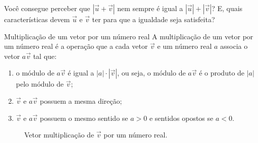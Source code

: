 \begin{reflection}

Você consegue perceber que \(|\vec{u}+\vec{v}|\) nem sempre é igual a \(|\vec{u}|+|\vec{v}|\)? E, quais características devem \(\vec{u}\) e \(\vec{v}\) ter para que a igualdade seja satisfeita?
\end{reflection}


\begin{observationtitle}{Multiplicação de um vetor por um número real}
A multiplicação de um vetor por um número real é a operação que a cada vetor \(\vec{v}\) e um número real \(a\) associa o vetor \(a\vec{v}\) tal que:
\begin{enumerate}
\item {} 
o módulo de \(a\vec{v}\) é igual a \(|a|\cdot|\vec{v}|\), ou seja, o módulo de \(a\vec{v}\) é o produto de \(|a|\)  pelo módulo de \(\vec{v}\);

\item {} 
\(\vec{v}\) e \(a\vec{v}\) possuem a mesma direção;

\item {} 
\(\vec{v}\) e \(a\vec{v}\) possuem o mesmo sentido se \(a>0\) e sentidos opostos se \(a<0\).

\end{enumerate}
\begin{figure}[H]
\centering
{} 
 \caption{Vetor multiplicação de $\vec{v}$ por um número real.} \label{fig-geometria-operacoesvetores-14} 
 \end{figure}
\end{observationtitle}


